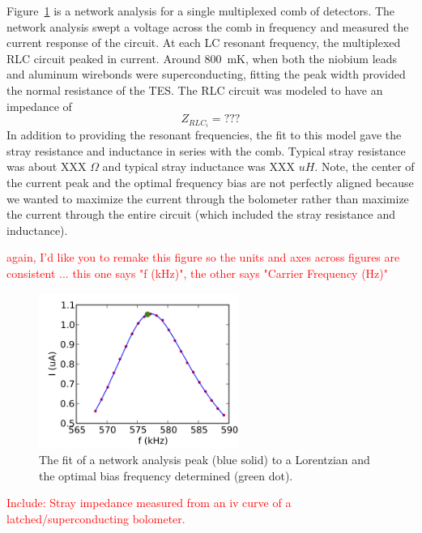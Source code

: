 Figure~\ref{fig:network_analysis} is a network analysis for a single multiplexed comb of detectors. 
The network analysis swept a voltage across the comb in frequency and measured the current response of the circuit. 
At each LC resonant frequency, the multiplexed RLC circuit peaked in current. 
Around 800~mK, when both the niobium leads and aluminum wirebonds were superconducting, fitting the peak width provided the normal resistance of the \ac{TES}. 
The RLC circuit was modeled to have an impedance of 
\begin{equation}
Z_{RLC_{i}} = ???
\end{equation}
In addition to providing the resonant frequencies, the fit to this model gave the stray resistance and inductance in series with the comb. 
Typical stray resistance was about XXX $\Omega$ and typical stray inductance was XXX $uH$.
Note, the center of the current peak and the optimal frequency bias are not perfectly aligned because we wanted to maximize the current through the bolometer rather than maximize the current through the entire circuit (which included the stray resistance and inductance).

\textcolor{red}{again, I'd like you to remake this figure so the units and axes across figures are consistent ... this one says "f (kHz)", the other says "Carrier Frequency (Hz)"}

\begin{figure}[htbp]
\begin{center}
\includegraphics[height=2in]{figures/netanal_zoom.png}
\caption{The fit of a network analysis peak (blue solid) to a Lorentzian and the optimal bias frequency determined (green dot).
\label{fig:network_analysis} }
\end{center}
\end{figure}

\textcolor{red}{Include: Stray impedance measured from an iv curve of a latched/superconducting bolometer.}


